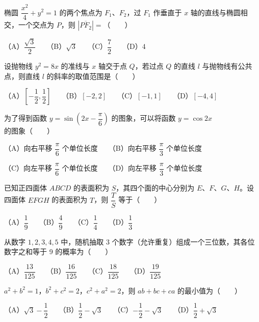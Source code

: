 \begin{question}
椭圆 $\dfrac{x^2}{4}+y^2=1$ 的两个焦点为 $F_1\text{、}F_2$，过 $F_1$ 作垂直于 $x$ 轴的直线与椭圆相交，一个交点为 $P$，则 $|\overline{PF_2}|=$\mbox{（　　）}

（A）$\dfrac{\sqrt3}{2}$　　（B）$\sqrt3$　　（C）$\dfrac72$　　（D）$4$

\end{question}
\begin{question}
设抛物线 $y^2=8x$ 的准线与 $x$ 轴交于点 $Q$，若过点 $Q$ 的直线 $l$ 与抛物线有公共点，则直线 $l$ 的斜率的取值范围是\mbox{（　　）}

（A）$\left[-\dfrac12,\dfrac12\right]$　　（B）$[-2,2]$　　（C）$[-1,1]$　　（D）$[-4,4]$

\end{question}
\begin{question}
为了得到函数 $y=\sin\left(2x-\dfrac\pi6\right)$ 的图象，可以将函数 $y=\cos2x$ 的图象\mbox{（　　）}

（A）向右平移 $\dfrac\pi6$ 个单位长度　　（B）向右平移 $\dfrac\pi3$ 个单位长度

（C）向左平移 $\dfrac\pi6$ 个单位长度　　（D）向左平移 $\dfrac\pi3$ 个单位长度

\end{question}
\begin{question}
已知正四面体 $ABCD$ 的表面积为 $S$，其四个面的中心分别为 $E\text{、}F\text{、}G\text{、}H$。设四面体 $EFGH$ 的表面积为 $T$，则 $\dfrac TS$ 等于\mbox{（　　）}

（A）$\dfrac19$　　（B）$\dfrac49$　　（C）$\dfrac14$　　（D）$\dfrac13$

\end{question}
\begin{question}
从数字 $1,2,3,4,5$ 中，随机抽取 3 个数字（允许重复）组成一个三位数，其各位数字之和等于 9 的概率为\mbox{（　　）}

（A）$\dfrac{13}{125}$　　（B）$\dfrac{16}{125}$　　（C）$\dfrac{18}{125}$　　（D）$\dfrac{19}{125}$

\end{question}
\begin{question}
$a^2+b^2=1$，$b^2+c^2=2$，$c^2+a^2=2$，则 $ab+bc+ca$ 的最小值为\mbox{（　　）}

（A）$\sqrt3-\dfrac12$　　（B）$\dfrac12-\sqrt3$　　（C）$-\dfrac12-\sqrt3$　　（D）$\dfrac12+\sqrt3$

\end{question}

